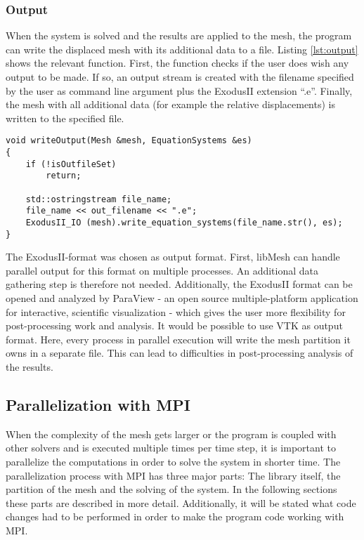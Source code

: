   \subsubsection{Output}\label{sec:Impl-Details-Output}
   When the system is solved and the results are applied to the mesh, the program can write the displaced mesh with its additional data to a file. Listing \ref{lst:output} shows the relevant function. First, the function checks if the user does wish any output to be made. If so, an output stream is created with the filename specified by the user as command line argument plus the ExodusII extension ``.e''. Finally, the mesh with all additional data (for example the relative displacements) is written to the specified file.
\begin{lstlisting}[caption=Store results in mesh file,label=lst:output,keepspaces=true]
void writeOutput(Mesh &mesh, EquationSystems &es)
{
	if (!isOutfileSet)
		return;
	
	std::ostringstream file_name;
	file_name << out_filename << ".e";	
	ExodusII_IO (mesh).write_equation_systems(file_name.str(), es);
}  
\end{lstlisting}
   The ExodusII-format was chosen as output format. First, libMesh can handle parallel output for this format on multiple processes. An additional data gathering step is therefore not needed. Additionally, the ExodusII format can be opened and analyzed by ParaView - an open source multiple-platform application for interactive, scientific visualization - which gives the user more flexibility for post-processing work and analysis. It would be possible to use VTK as output format. Here, every process in parallel execution will write the mesh partition it owns in a separate file. This can lead to difficulties in post-processing analysis of the results.
    
 
 
 \subsection{Parallelization with MPI}\label{sec:Impl-Parallel}
  When the complexity of the mesh gets larger or the program is coupled with other solvers and is executed multiple times per time step, it is important to parallelize the computations in order to solve the system in shorter time. The parallelization process with MPI has three major parts: The library itself, the partition of the mesh and the solving of the system. In the following sections these parts are described in more detail. Additionally, it will be stated what code changes had to be performed in order to make the program code working with MPI.
 
